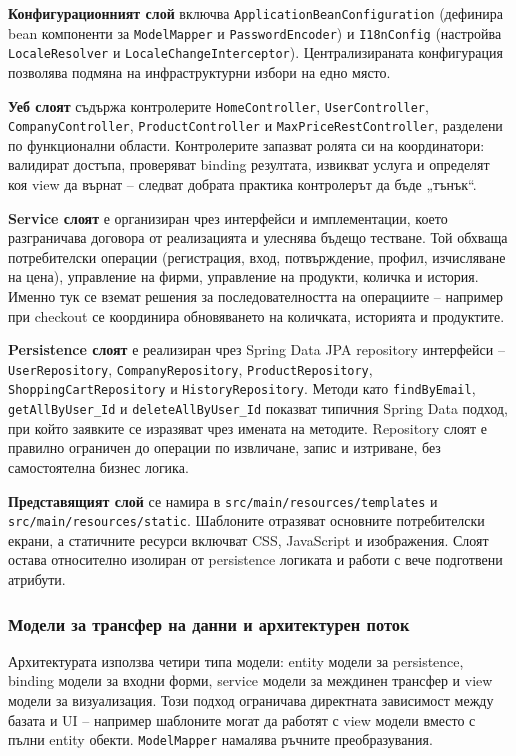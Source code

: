 \textbf{Конфигурационният слой} включва \texttt{ApplicationBeanConfiguration} (дефинира bean компоненти за \texttt{ModelMapper} и \texttt{PasswordEncoder}) и \texttt{I18nConfig} (настройва \texttt{LocaleResolver} и \texttt{LocaleChangeInterceptor}). Централизираната конфигурация позволява подмяна на инфраструктурни избори на едно място.

\textbf{Уеб слоят} съдържа контролерите \texttt{HomeController}, \texttt{UserController}, \texttt{CompanyController}, \texttt{ProductController} и \texttt{MaxPriceRestController}, разделени по функционални области. Контролерите запазват ролята си на координатори: валидират достъпа, проверяват binding резултата, извикват услуга и определят коя view да върнат -- следват добрата практика контролерът да бъде „тънък“.

\textbf{Service слоят} е организиран чрез интерфейси и имплементации, което разграничава договора от реализацията и улеснява бъдещо тестване. Той обхваща потребителски операции (регистрация, вход, потвърждение, профил, изчисляване на цена), управление на фирми, управление на продукти, количка и история. Именно тук се вземат решения за последователността на операциите -- например при checkout се координира обновяването на количката, историята и продуктите.

\textbf{Persistence слоят} е реализиран чрез Spring Data JPA repository интерфейси -- \texttt{UserRepository}, \texttt{CompanyRepository}, \texttt{ProductRepository}, \texttt{ShoppingCartRepository} и \texttt{HistoryRepository}. Методи като \texttt{findByEmail}, \texttt{getAllByUser\_Id} и \texttt{deleteAllByUser\_Id} показват типичния Spring Data подход, при който заявките се изразяват чрез имената на методите. Repository слоят е правилно ограничен до операции по извличане, запис и изтриване, без самостоятелна бизнес логика.

\textbf{Представящият слой} се намира в \texttt{src/main/resources/templates} и \texttt{src/main/resources/static}. Шаблоните отразяват основните потребителски екрани, а статичните ресурси включват CSS, JavaScript и изображения. Слоят остава относително изолиран от persistence логиката и работи с вече подготвени атрибути.

\subsubsection{Модели за трансфер на данни и архитектурен поток}

Архитектурата използва четири типа модели: entity модели за persistence, binding модели за входни форми, service модели за междинен трансфер и view модели за визуализация. Този подход ограничава директната зависимост между базата и UI -- например шаблоните могат да работят с view модели вместо с пълни entity обекти. \texttt{ModelMapper} намалява ръчните преобразувания.

